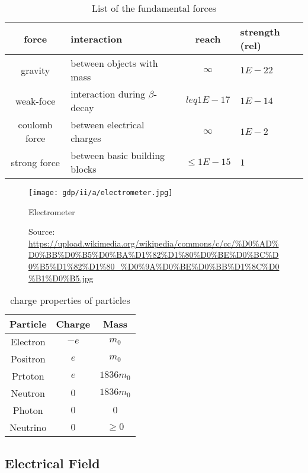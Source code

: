 \begin{table}
    \begin{tabularx}{\textwidth}{|c|l|c|X|}
        \hline
        \textbf{force} & \textbf{interaction} & \textbf{reach} & \textbf{strength (rel)}\\ 
        \hline
        gravity & between objects with mass & $\infty$ & $1E-22$ \\ 
        weak-foce & interaction during $\beta$-decay & $leq 1E-17$ & $1E-14$ \\ 
        coulomb force & between electrical charges & $\infty$ & $1E-2$ \\ 
        strong force & between basic building blocks & $\leq 1E-15$ & $1$\\ 
        \hline
    \end{tabularx}

    \caption{List of the fundamental forces}
    \label{tab:gdp:iia:fund_forces}
\end{table}



\begin{figure}
    \centering
    \texttt{[image: gdp/ii/a/electrometer.jpg]}
    \caption{Electrometer}
    \label{fig:gdp:ii:a:electrometer}
    \caption*{Source: \url{https://upload.wikimedia.org/wikipedia/commons/c/cc/\%D0\%AD\%D0\%BB\%D0\%B5\%D0\%BA\%D1\%82\%D1\%80\%D0\%BE\%D0\%BC\%D0\%B5\%D1\%82\%D1\%80_\%D0\%9A\%D0\%BE\%D0\%BB\%D1\%8C\%D0\%B1\%D0\%B5.jpg} }
\end{figure}

\begin{table}
    \begin{tabularx}{\textwidth}{c c c}
        Particle & Charge & Mass\\
        \hline
        Electron & $-e$ & $m_0$ \\
        Positron & $e$ & $m_0$ \\
        Prtoton & $e$ & $1836m_0$ \\
        Neutron & $0$ & $1836m_0$ \\
        Photon & $0$ & $0$ \\
        Neutrino & $0$ & $\geq 0$ \\
    \end{tabularx}
    \caption{charge properties of particles}
    \label{tab:gdp:ii:a:parti_cha}
\end{table}




\subsection{Electrical Field}


































